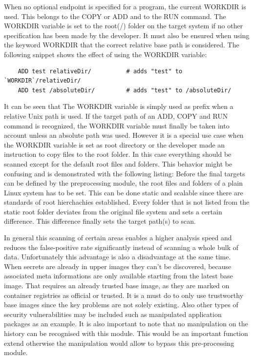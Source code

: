 When no optional endpoint is specified for a program, the current WORKDIR is used. This belongs to the COPY or ADD and to the RUN command.
The WORKDIR variable is set to the root(/) folder on the target system if no other specification has been made by the developer. 
It must also be ensured when using the keyword WORKDIR that the correct relative base path is considered. 
The following snippet shows the effect of using the WORKDIR variable:
\begin{lstlisting}
	ADD test relativeDir/          # adds "test" to `WORKDIR`/relativeDir/
	ADD test /absoluteDir/         # adds "test" to /absoluteDir/
\end{lstlisting}
It can be seen that The WORKDIR variable is simply used as prefix when a relative Unix path is used.
If the target path of an ADD, COPY and RUN command is recognized, the WORKDIR variable must finally be taken into account unless an absolute path was used.
However it is a special use case when the WORKDIR variable is set as root directory or the developer made an instruction to copy files to the root folder. In this case everything should be scanned except for the default root files and folders.
This behavior might be confusing and is demonstrated with the following listing:
Before the final targets can be defined by the preprocessing module, the root files and folders of a plain Linux system has to be set. This can be done static and scalable since there are standards of root hierchachies established. Every folder that is not listed from the static root folder deviates from the original file system and sets a certain difference. This difference finally sets the target path(s) to scan. 

In general this scanning of certain areas enables a higher analysis speed and reduces the false-positive rate significantly instead of scanning a whole bulk of data. Unfortunately this advantage is also a disadvantage at the same time. When secrets are already in upper images they can't be discovered, because associated meta informations are only available starting from the latest base image. That requires an already trusted base image, as they are marked on container registries as official or trusted. It is a must do to only use trustworthy base images since the key problems are not solely existing. Also other types of security vulnerabilities may be included such as manipulated application packages as an example. 
It is also important to note that no manipulation on the history can be recognised with this module. This would be an important function extend otherwise the manipulation would allow to bypass this pre-processing module. 

